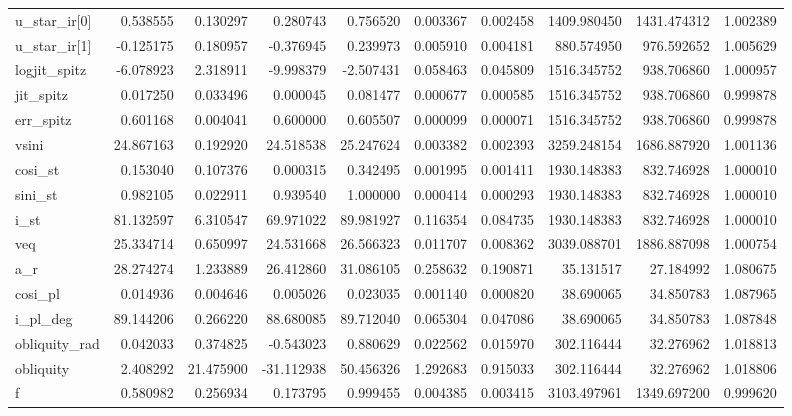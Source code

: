 \begin{tabular}{lrrrrrrrrr}
u\_star\_ir[0]  &   0.538555 &   0.130297 &   0.280743 &    0.756520 &   0.003367 &  0.002458 &  1409.980450 &  1431.474312 &  1.002389 \\
u\_star\_ir[1]  &  -0.125175 &   0.180957 &  -0.376945 &    0.239973 &   0.005910 &  0.004181 &   880.574950 &   976.592652 &  1.005629 \\
logjit\_spitz  &  -6.078923 &   2.318911 &  -9.998379 &   -2.507431 &   0.058463 &  0.045809 &  1516.345752 &   938.706860 &  1.000957 \\
jit\_spitz     &   0.017250 &   0.033496 &   0.000045 &    0.081477 &   0.000677 &  0.000585 &  1516.345752 &   938.706860 &  0.999878 \\
err\_spitz     &   0.601168 &   0.004041 &   0.600000 &    0.605507 &   0.000099 &  0.000071 &  1516.345752 &   938.706860 &  0.999878 \\
vsini         &  24.867163 &   0.192920 &  24.518538 &   25.247624 &   0.003382 &  0.002393 &  3259.248154 &  1686.887920 &  1.001136 \\
cosi\_st       &   0.153040 &   0.107376 &   0.000315 &    0.342495 &   0.001995 &  0.001411 &  1930.148383 &   832.746928 &  1.000010 \\
sini\_st       &   0.982105 &   0.022911 &   0.939540 &    1.000000 &   0.000414 &  0.000293 &  1930.148383 &   832.746928 &  1.000010 \\
i\_st          &  81.132597 &   6.310547 &  69.971022 &   89.981927 &   0.116354 &  0.084735 &  1930.148383 &   832.746928 &  1.000010 \\
veq           &  25.334714 &   0.650997 &  24.531668 &   26.566323 &   0.011707 &  0.008362 &  3039.088701 &  1886.887098 &  1.000754 \\
a\_r           &  28.274274 &   1.233889 &  26.412860 &   31.086105 &   0.258632 &  0.190871 &    35.131517 &    27.184992 &  1.080675 \\
cosi\_pl       &   0.014936 &   0.004646 &   0.005026 &    0.023035 &   0.001140 &  0.000820 &    38.690065 &    34.850783 &  1.087965 \\
i\_pl\_deg      &  89.144206 &   0.266220 &  88.680085 &   89.712040 &   0.065304 &  0.047086 &    38.690065 &    34.850783 &  1.087848 \\
obliquity\_rad &   0.042033 &   0.374825 &  -0.543023 &    0.880629 &   0.022562 &  0.015970 &   302.116444 &    32.276962 &  1.018813 \\
obliquity     &   2.408292 &  21.475900 & -31.112938 &   50.456326 &   1.292683 &  0.915033 &   302.116444 &    32.276962 &  1.018806 \\
f             &   0.580982 &   0.256934 &   0.173795 &    0.999455 &   0.004385 &  0.003415 &  3103.497961 &  1349.697200 &  0.999620 \\
\bottomrule
\end{tabular}

